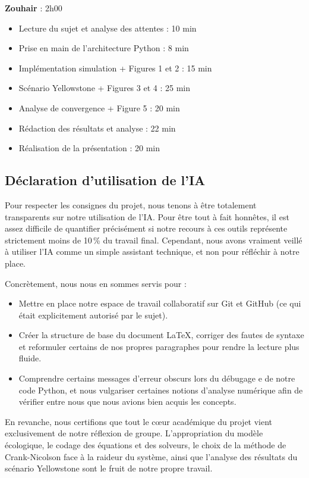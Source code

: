 \documentclass[12pt,a4paper]{article}
\begin{document}
\vspace{0.5cm}
\textbf{Zouhair} : 2h00
\begin{itemize}
    \item Lecture du sujet et analyse des attentes : 10 min
    \item Prise en main de l'architecture Python : 8 min
    \item Implémentation simulation + Figures 1 et 2 : 15 min
    \item Scénario Yellowstone + Figures 3 et 4 : 25 min
    \item Analyse de convergence + Figure 5 : 20 min
    \item Rédaction des résultats et analyse : 22 min
    \item Réalisation de la présentation : 20 min
\end{itemize}

\subsection*{Déclaration d'utilisation de l'IA}

Pour respecter les consignes du projet, nous tenons à être totalement transparents sur notre utilisation de l'IA. Pour être tout à fait honnêtes, il est assez difficile de quantifier précisément si notre recours à ces outils représente strictement moins de 10\,\% du travail final. Cependant, nous avons vraiment veillé à utiliser l'IA comme un simple assistant technique, et non pour réfléchir à notre place.

Concrètement, nous nous en sommes servis pour :
\begin{itemize}
    \item Mettre en place notre espace de travail collaboratif sur Git et GitHub (ce qui était explicitement autorisé par le sujet).
    \item Créer la structure de base du document \LaTeX{}, corriger des fautes de syntaxe et reformuler certains de nos propres paragraphes pour rendre la lecture plus fluide.
    \item Comprendre certains messages d'erreur obscurs lors du débugage e de notre code Python, et nous vulgariser certaines notions d'analyse numérique afin de vérifier entre nous que nous avions bien acquis les concepts.
\end{itemize}

En revanche, nous certifions que tout le cœur académique du projet vient exclusivement de notre réflexion de groupe. L'appropriation du modèle écologique, le codage des équations et des solveurs, le choix de la méthode de Crank-Nicolson face à la raideur du système, ainsi que l'analyse des résultats du scénario Yellowstone sont le fruit de notre propre travail.
\end{document}
